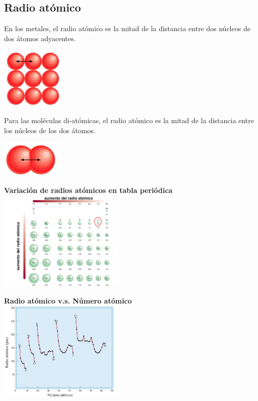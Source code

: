     \subsection{Radio atómico}
        \indent En los metales, el radio atómico es la mitad de la distancia entre dos núcleos de dos átomos adyacentes.
        \begin{center} \includegraphics[width=3cm]{./imagenes/radioAtomicoMetales.png} \end{center}
        \sangria Para las moléculas di-atómicas, el radio atómico es la mitad de la distancia entre los núcleos de los dos átomos.
        \begin{center} \includegraphics[width=3cm]{./imagenes/radioAtomicoDiMoleculas.png} \end{center}
        \saltoPag%
        \begin{center} \textbf{Variación de radios atómicos en tabla periódica} \\[10pt] \includegraphics[width=6cm]{./imagenes/radiosAtomicosVariacion.png} \end{center}
        \begin{center} \textbf{Radio atómico v.s. Número atómico} \\[10pt] \includegraphics[width=6cm]{./imagenes/radioAtomicoVSNumeroAtomico.png} \end{center}
